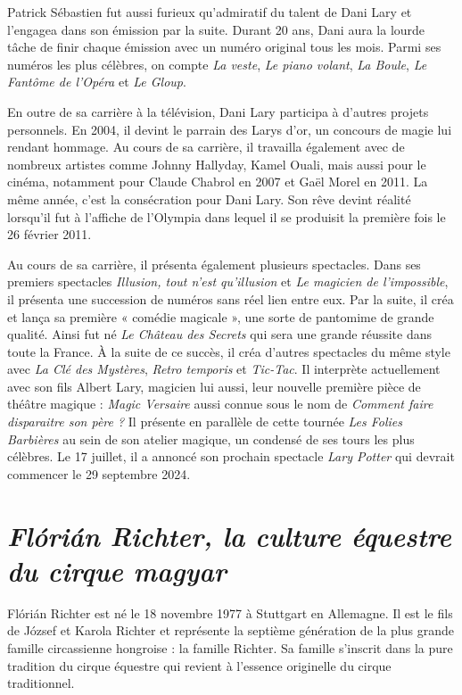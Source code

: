 Patrick Sébastien fut aussi furieux qu’admiratif du talent de Dani Lary et l’engagea dans son émission par la suite. Durant 20 ans, Dani aura la lourde tâche de finir chaque émission avec un numéro original tous les mois. Parmi ses numéros les plus célèbres, on compte \textit{La veste}, \textit{Le piano volant}, \textit{La Boule}, \textit{Le Fantôme de l’Opéra} et \textit{Le Gloup}.

En outre de sa carrière à la télévision, Dani Lary participa à d’autres projets personnels. En 2004, il devint le parrain des Larys d’or, un concours de magie lui rendant hommage. Au cours de sa carrière, il travailla également avec de nombreux artistes comme Johnny Hallyday, Kamel Ouali, mais aussi pour le cinéma, notamment pour Claude Chabrol en 2007 et Gaël Morel en 2011. La même année, c'est la consécration pour Dani Lary. Son rêve devint réalité lorsqu’il fut à l’affiche de l’Olympia dans lequel il se produisit la première fois le 26 février 2011.

Au cours de sa carrière, il présenta également plusieurs spectacles. Dans ses premiers spectacles \textit{Illusion, tout n’est qu’illusion} et \textit{Le magicien de l’impossible}, il présenta une succession de numéros sans réel lien entre eux. Par la suite, il créa et lança sa première « comédie magicale », une sorte de pantomime de grande qualité. Ainsi fut né \textit{Le Château des Secrets} qui sera une grande réussite dans toute la France. À la suite de ce succès, il créa d’autres spectacles du même style avec \textit{La Clé des Mystères}, \textit{Retro temporis} et \textit{Tic-Tac}. Il interprète actuellement avec son fils Albert Lary, magicien lui aussi, leur nouvelle première pièce de théâtre magique : \textit{Magic Versaire} aussi connue sous le nom de \textit{Comment faire disparaitre son père ?} Il présente en parallèle de cette tournée \textit{Les Folies Barbières} au sein de son atelier magique, un condensé de ses tours les plus célèbres. Le 17 juillet, il a annoncé son prochain spectacle \textit{Lary Potter} qui devrait commencer le 29 septembre 2024. 

\section*{\textit{Flórián Richter, la culture équestre du cirque magyar}}
{}

Flórián Richter est né le 18 novembre 1977 à Stuttgart en Allemagne. Il est le fils de József et Karola Richter et représente la septième génération de la plus grande famille circassienne hongroise : la famille Richter. Sa famille s’inscrit dans la pure tradition du cirque équestre qui revient à l’essence originelle du cirque traditionnel. 

